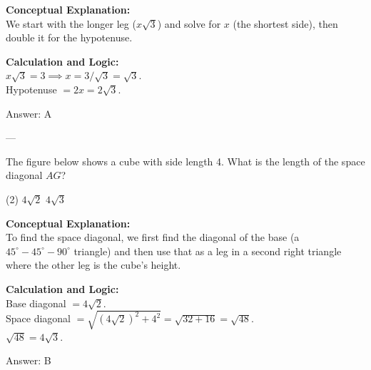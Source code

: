 \documentclass[11pt,paper=a4,answers]{exam}
\begin{document}
\begin{questions}
\begin{solution}
\textbf{Conceptual Explanation:} \\
We start with the longer leg ($x\sqrt{3}$) and solve for $x$ (the shortest side), then double it for the hypotenuse.

\vspace{10pt}
\textbf{Calculation and Logic:} \\
$x\sqrt{3} = 3 \implies x = 3 / \sqrt{3} = \sqrt{3}$. \\
Hypotenuse $= 2x = 2\sqrt{3}$.

\vspace{15pt}
Answer: \colorbox{yellow!100}{A}
\end{solution}

---

\question
The figure below shows a cube with side length 4. What is the length of the space diagonal $AG$?
\begin{center}
\end{center}
\begin{tasks}(2)
    \task $4\sqrt{2}$
    \task $4\sqrt{3}$
\end{tasks}

\begin{solution}
\textbf{Conceptual Explanation:} \\
To find the space diagonal, we first find the diagonal of the base (a $45^\circ-45^\circ-90^\circ$ triangle) and then use that as a leg in a second right triangle where the other leg is the cube's height.

\vspace{10pt}
\textbf{Calculation and Logic:} \\
Base diagonal $= 4\sqrt{2}$. \\
Space diagonal $= \sqrt{(4\sqrt{2})^2 + 4^2} = \sqrt{32 + 16} = \sqrt{48}$. \\
$\sqrt{48} = 4\sqrt{3}$.

\vspace{15pt}
Answer: \colorbox{yellow!100}{B}
\end{solution}


\end{questions}
\end{document}

